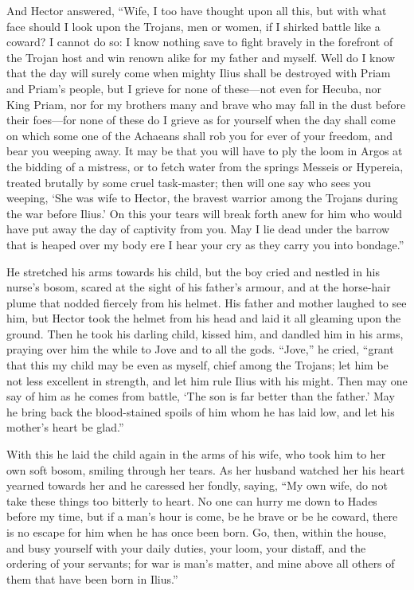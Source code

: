 And Hector answered, “Wife, I too have thought upon all this, but with
what face should I look upon the Trojans, men or women, if I shirked
battle like a coward? I cannot do so: I know nothing save to fight bravely
in the forefront of the Trojan host and win renown alike for my father and
myself. Well do I know that the day will surely come when mighty Ilius
shall be destroyed with Priam and Priam’s people, but I grieve for none of
these—not even for Hecuba, nor King Priam, nor for my brothers many
and brave who may fall in the dust before their foes—for none of
these do I grieve as for yourself when the day shall come on which some
one of the Achaeans shall rob you for ever of your freedom, and bear you
weeping away. It may be that you will have to ply the loom in Argos at the
bidding of a mistress, or to fetch water from the springs Messeis or
Hypereia, treated brutally by some cruel task-master; then will one say
who sees you weeping, ‘She was wife to Hector, the bravest warrior among
the Trojans during the war before Ilius.’ On this your tears will break
forth anew for him who would have put away the day of captivity from you.
May I lie dead under the barrow that is heaped over my body ere I hear
your cry as they carry you into bondage.”

He stretched his arms towards his child, but the boy cried and nestled in
his nurse’s bosom, scared at the sight of his father’s armour, and at the
horse-hair plume that nodded fiercely from his helmet. His father and
mother laughed to see him, but Hector took the helmet from his head and
laid it all gleaming upon the ground. Then he took his darling child,
kissed him, and dandled him in his arms, praying over him the while to
Jove and to all the gods. “Jove,” he cried, “grant that this my child may
be even as myself, chief among the Trojans; let him be not less excellent
in strength, and let him rule Ilius with his might. Then may one say of
him as he comes from battle, ‘The son is far better than the father.’ May
he bring back the blood-stained spoils of him whom he has laid low, and
let his mother’s heart be glad.”

With this he laid the child again in the arms of his wife, who took him to
her own soft bosom, smiling through her tears. As her husband watched her
his heart yearned towards her and he caressed her fondly, saying, “My own
wife, do not take these things too bitterly to heart. No one can hurry me
down to Hades before my time, but if a man’s hour is come, be he brave or
be he coward, there is no escape for him when he has once been born. Go,
then, within the house, and busy yourself with your daily duties, your
loom, your distaff, and the ordering of your servants; for war is man’s
matter, and mine above all others of them that have been born in Ilius.”

